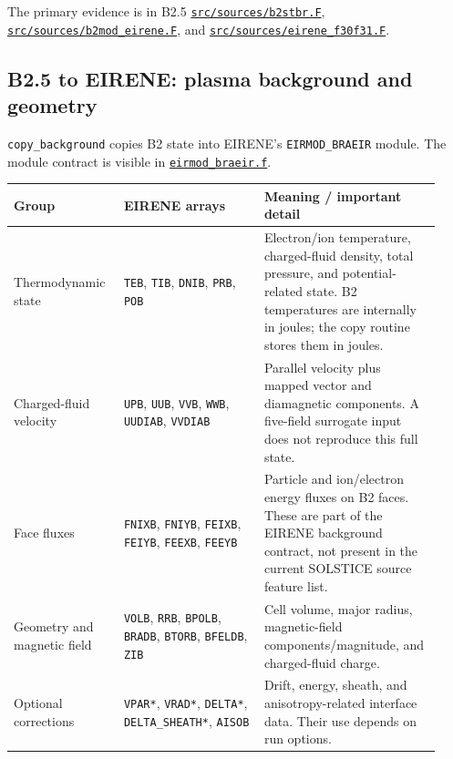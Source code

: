 \documentclass[11pt]{article}
\begin{document}
The primary evidence is in B2.5
\href{https://github.com/iterorganization/B2.5/blob/cb7d15b2878074bb450666bebee4b1df02ef79e6/src/sources/b2stbr.F}{\texttt{src/sources/b2stbr.F}},
\href{https://github.com/iterorganization/B2.5/blob/cb7d15b2878074bb450666bebee4b1df02ef79e6/src/sources/b2mod_eirene.F}{\texttt{src/sources/b2mod\_eirene.F}}, and
\href{https://github.com/iterorganization/B2.5/blob/cb7d15b2878074bb450666bebee4b1df02ef79e6/src/sources/eirene_f30f31.F}{\texttt{src/sources/eirene\_f30f31.F}}.

\subsection{B2.5 to EIRENE: plasma background and geometry}

\texttt{copy\_background} copies B2 state into EIRENE's \texttt{EIRMOD\_BRAEIR} module. The module contract is visible in
\href{https://github.com/iterorganization/EIRENE/blob/f8f63fa0f69d7fb64a7d19f2ec372fd58eb5efc5/src/interfaces/couple_SOLPS-ITER/eirmod_braeir.f}{\texttt{eirmod\_braeir.f}}.

\begin{longtable}{@{}p{0.23\linewidth}p{0.31\linewidth}p{0.39\linewidth}@{}}
\toprule
Group & EIRENE arrays & Meaning / important detail \\
\midrule
\endhead
Thermodynamic state & \texttt{TEB}, \texttt{TIB}, \texttt{DNIB}, \texttt{PRB}, \texttt{POB} & Electron/ion temperature, charged-fluid density, total pressure, and potential-related state. B2 temperatures are internally in joules; the copy routine stores them in joules. \\
Charged-fluid velocity & \texttt{UPB}, \texttt{UUB}, \texttt{VVB}, \texttt{WWB}, \texttt{UUDIAB}, \texttt{VVDIAB} & Parallel velocity plus mapped vector and diamagnetic components. A five-field surrogate input does not reproduce this full state. \\
Face fluxes & \texttt{FNIXB}, \texttt{FNIYB}, \texttt{FEIXB}, \texttt{FEIYB}, \texttt{FEEXB}, \texttt{FEEYB} & Particle and ion/electron energy fluxes on B2 faces. These are part of the EIRENE background contract, not present in the current SOLSTICE source feature list. \\
Geometry and magnetic field & \texttt{VOLB}, \texttt{RRB}, \texttt{BPOLB}, \texttt{BRADB}, \texttt{BTORB}, \texttt{BFELDB}, \texttt{ZIB} & Cell volume, major radius, magnetic-field components/magnitude, and charged-fluid charge. \\
Optional corrections & \texttt{VPAR*}, \texttt{VRAD*}, \texttt{DELTA*}, \texttt{DELTA\_SHEATH*}, \texttt{AISOB} & Drift, energy, sheath, and anisotropy-related interface data. Their use depends on run options. \\
\bottomrule
\end{longtable}
\end{document}
